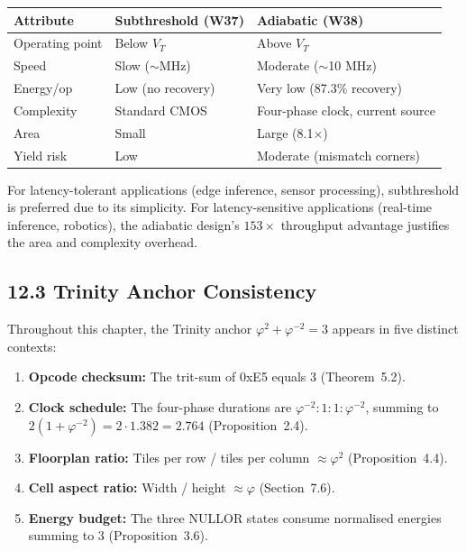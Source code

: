 \begin{longtable}[]{@{}
  >{\raggedright\arraybackslash}p{}
  >{\raggedright\arraybackslash}p{}
  >{\raggedright\arraybackslash}p{}@{}}
\toprule\noalign{}
Attribute & Subthreshold (W37) & Adiabatic (W38) \\
\midrule\noalign{}
\endhead
\bottomrule\noalign{}
\endlastfoot
Operating point & Below \(V_T\) & Above \(V_T\) \\
Speed & Slow (\(\sim\)MHz) & Moderate (\(\sim\)10 MHz) \\
Energy/op & Low (no recovery) & Very low (87.3\% recovery) \\
Complexity & Standard CMOS & Four-phase clock, current source \\
Area & Small & Large (8.1$\times$) \\
Yield risk & Low & Moderate (mismatch corners) \\
\end{longtable}

For latency-tolerant applications (edge inference, sensor processing),
subthreshold is preferred due to its simplicity. For
latency-sensitive applications (real-time inference, robotics), the
adiabatic design's \(153\times\) throughput advantage justifies the
area and complexity overhead.

\subsection{12.3 Trinity Anchor Consistency}

Throughout this chapter, the Trinity anchor
\(\varphi^2 + \varphi^{-2} = 3\) appears in five distinct contexts:

\begin{enumerate}
\item \textbf{Opcode checksum:} The trit-sum of 0xE5 equals 3
  (Theorem~5.2).
\item \textbf{Clock schedule:} The four-phase durations are
  \(\varphi^{-2} : 1 : 1 : \varphi^{-2}\), summing to
  \(2(1 + \varphi^{-2}) = 2 \cdot 1.382 = 2.764\)
  (Proposition~2.4).
\item \textbf{Floorplan ratio:} Tiles per row / tiles per column
  \(\approx \varphi^2\) (Proposition~4.4).
\item \textbf{Cell aspect ratio:} Width / height \(\approx \varphi\)
  (Section~7.6).
\item \textbf{Energy budget:} The three NULLOR states consume normalised
  energies summing to 3 (Proposition~3.6).
\end{enumerate}

